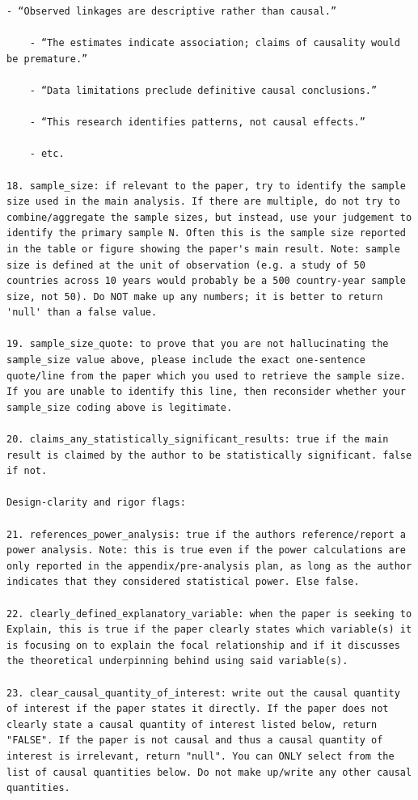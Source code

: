 \documentclass[12pt]{article}
\begin{document}
{\begin{Verbatim}[breaklines=true]
    - “Observed linkages are descriptive rather than causal.”
    
    - “The estimates indicate association; claims of causality would be premature.”
    
    - “Data limitations preclude definitive causal conclusions.”
    
    - “This research identifies patterns, not causal effects.”
    
    - etc.

18. sample_size: if relevant to the paper, try to identify the sample size used in the main analysis. If there are multiple, do not try to combine/aggregate the sample sizes, but instead, use your judgement to identify the primary sample N. Often this is the sample size reported in the table or figure showing the paper's main result. Note: sample size is defined at the unit of observation (e.g. a study of 50 countries across 10 years would probably be a 500 country-year sample size, not 50). Do NOT make up any numbers; it is better to return 'null' than a false value.

19. sample_size_quote: to prove that you are not hallucinating the sample_size value above, please include the exact one-sentence quote/line from the paper which you used to retrieve the sample size. If you are unable to identify this line, then reconsider whether your sample_size coding above is legitimate.

20. claims_any_statistically_significant_results: true if the main result is claimed by the author to be statistically significant. false if not.

Design‑clarity and rigor flags:

21. references_power_analysis: true if the authors reference/report a power analysis. Note: this is true even if the power calculations are only reported in the appendix/pre-analysis plan, as long as the author indicates that they considered statistical power. Else false.

22. clearly_defined_explanatory_variable: when the paper is seeking to Explain, this is true if the paper clearly states which variable(s) it is focusing on to explain the focal relationship and if it discusses the theoretical underpinning behind using said variable(s).

23. clear_causal_quantity_of_interest: write out the causal quantity of interest if the paper states it directly. If the paper does not clearly state a causal quantity of interest listed below, return "FALSE". If the paper is not causal and thus a causal quantity of interest is irrelevant, return "null". You can ONLY select from the list of causal quantities below. Do not make up/write any other causal quantities.
    

\end{Verbatim}}
\end{document}
